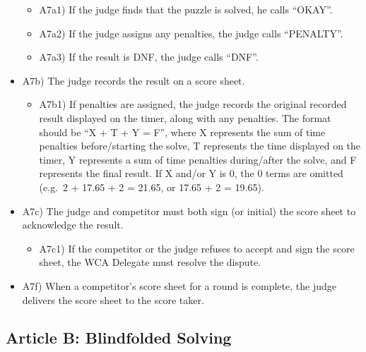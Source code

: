 \begin{itemize}
  \begin{itemize}
  \item
    A7a1) If the judge finds that the puzzle is solved, he calls
    ``OKAY''.
  \item
    A7a2) If the judge assigns any penalties, the judge calls
    ``PENALTY''.
  \item
    A7a3) If the result is DNF, the judge calls ``DNF''.
  \end{itemize}
\item
  A7b) The judge records the result on a score sheet.

  \begin{itemize}
  \item
    A7b1) If penalties are assigned, the judge records the original
    recorded result displayed on the timer, along with any penalties.
    The format should be ``X + T + Y = F'', where X represents the sum
    of time penalties before/starting the solve, T represents the time
    displayed on the timer, Y represents a sum of time penalties
    during/after the solve, and F represents the final result. If X
    and/or Y is 0, the 0 terms are omitted (e.g.~2 + 17.65 + 2 = 21.65,
    or 17.65 + 2 = 19.65).
  \end{itemize}
\item
  A7c) The judge and competitor must both sign (or initial) the score
  sheet to acknowledge the result.

  \begin{itemize}
  \item
    A7c1) If the competitor or the judge refuses to accept and sign the
    score sheet, the WCA Delegate must resolve the dispute.
  \end{itemize}
\item
  A7f) When a competitor's score sheet for a round is complete, the
  judge delivers the score sheet to the score taker.
\end{itemize}

\subsection{ Article B: Blindfolded Solving}

